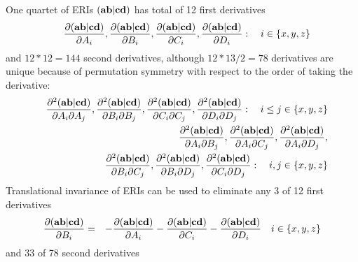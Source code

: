 \documentclass[12pt]{article}
\begin{document}
One quartet of ERIs $({\bf ab}|{\bf cd})$ has total of 12 first derivatives
\begin{eqnarray}
& & \frac{\partial ({\bf ab}|{\bf cd})}{\partial A_i}, \frac{\partial ({\bf ab}|{\bf cd})}{\partial B_i},
\frac{\partial ({\bf ab}|{\bf cd})}{\partial C_i},
\frac{\partial ({\bf ab}|{\bf cd})}{\partial D_i} :\quad i \in \{x,y,z\} \nonumber
\end{eqnarray}
and $12*12=144$ second derivatives, although $12*13/2=78$ derivatives are unique because of
permutation symmetry with respect to the order of taking the derivative:
\begin{eqnarray}
& & \frac{\partial^2 ({\bf ab}|{\bf cd})}{\partial A_i \partial A_j}, \frac{\partial^2 ({\bf ab}|{\bf cd})}{\partial B_i \partial B_j},
\frac{\partial^2 ({\bf ab}|{\bf cd})}{\partial C_i \partial C_j}, \frac{\partial^2 ({\bf ab}|{\bf cd})}{\partial D_i \partial D_j} :\quad
i \leq j \in \{x,y,z\} \nonumber \\
& & \frac{\partial^2 ({\bf ab}|{\bf cd})}{\partial A_i \partial B_j}, \frac{\partial^2 ({\bf ab}|{\bf cd})}{\partial A_i \partial C_j},
\frac{\partial^2 ({\bf ab}|{\bf cd})}{\partial A_i \partial D_j}, \nonumber \\
& & \frac{\partial^2 ({\bf ab}|{\bf cd})}{\partial B_i \partial C_j}, \frac{\partial^2 ({\bf ab}|{\bf cd})}{\partial B_i \partial D_j},
\frac{\partial^2 ({\bf ab}|{\bf cd})}{\partial C_i \partial D_j} : \quad i,j \in \{x,y,z\} \nonumber
\end{eqnarray}
Translational invariance of ERIs can be used to eliminate any 3 of 12 first derivatives
\begin{eqnarray} \label{eqn:TId1eri}
\frac{\partial ({\bf ab}|{\bf cd})}{\partial B_i} & = & - \frac{\partial ({\bf ab}|{\bf cd})}{\partial A_i} -
\frac{\partial ({\bf ab}|{\bf cd})}{\partial C_i} - \frac{\partial ({\bf ab}|{\bf cd})}{\partial D_i} \quad i \in \{x,y,z\}
\end{eqnarray}
and
33 of 78 second derivatives
\end{document}
